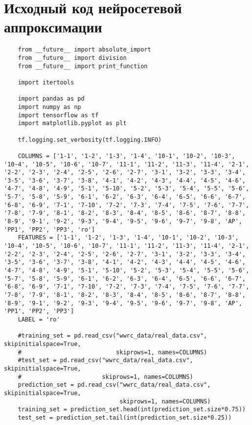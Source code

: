 \appendix

\chapter{Исходный код нейросетевой аппроксимации}

\begin{lstlisting}
    from __future__ import absolute_import
    from __future__ import division
    from __future__ import print_function
    
    import itertools
    
    import pandas as pd
    import numpy as np
    import tensorflow as tf
    import matplotlib.pyplot as plt
    
    tf.logging.set_verbosity(tf.logging.INFO)
    
    COLUMNS = ['1-1', '1-2', '1-3', '1-4', '10-1', '10-2', '10-3', '10-4', '10-5', '10-6', '10-7', '11-1', '11-2', '11-3', '11-4', '2-1', '2-2', '2-3', '2-4', '2-5', '2-6', '2-7', '3-1', '3-2', '3-3', '3-4', '3-5', '3-6', '3-7', '3-8', '4-1', '4-2', '4-3', '4-4', '4-5', '4-6', '4-7', '4-8', '4-9', '5-1', '5-10', '5-2', '5-3', '5-4', '5-5', '5-6', '5-7', '5-8', '5-9', '6-1', '6-2', '6-3', '6-4', '6-5', '6-6', '6-7', '6-8', '6-9', '7-1', '7-10', '7-2', '7-3', '7-4', '7-5', '7-6', '7-7', '7-8', '7-9', '8-1', '8-2', '8-3', '8-4', '8-5', '8-6', '8-7', '8-8', '8-9', '9-1', '9-2', '9-3', '9-4', '9-5', '9-6', '9-7', '9-8', 'AP', 'PP1', 'PP2', 'PP3', 'ro']
    FEATURES = ['1-1', '1-2', '1-3', '1-4', '10-1', '10-2', '10-3', '10-4', '10-5', '10-6', '10-7', '11-1', '11-2', '11-3', '11-4', '2-1', '2-2', '2-3', '2-4', '2-5', '2-6', '2-7', '3-1', '3-2', '3-3', '3-4', '3-5', '3-6', '3-7', '3-8', '4-1', '4-2', '4-3', '4-4', '4-5', '4-6', '4-7', '4-8', '4-9', '5-1', '5-10', '5-2', '5-3', '5-4', '5-5', '5-6', '5-7', '5-8', '5-9', '6-1', '6-2', '6-3', '6-4', '6-5', '6-6', '6-7', '6-8', '6-9', '7-1', '7-10', '7-2', '7-3', '7-4', '7-5', '7-6', '7-7', '7-8', '7-9', '8-1', '8-2', '8-3', '8-4', '8-5', '8-6', '8-7', '8-8', '8-9', '9-1', '9-2', '9-3', '9-4', '9-5', '9-6', '9-7', '9-8', 'AP', 'PP1', 'PP2', 'PP3']
    LABEL = 'ro'
    
    #training_set = pd.read_csv("wwrc_data/real_data.csv", skipinitialspace=True,
    #                           skiprows=1, names=COLUMNS)
    #test_set = pd.read_csv("wwrc_data/real_data.csv", skipinitialspace=True,
    #                       skiprows=1, names=COLUMNS)
    prediction_set = pd.read_csv("wwrc_data/real_data.csv", skipinitialspace=True,
                                 skiprows=1, names=COLUMNS)
    training_set = prediction_set.head(int(prediction_set.size*0.75))
    test_set = prediction_set.tail(int(prediction_set.size*0.25))
    

\end{lstlisting}
